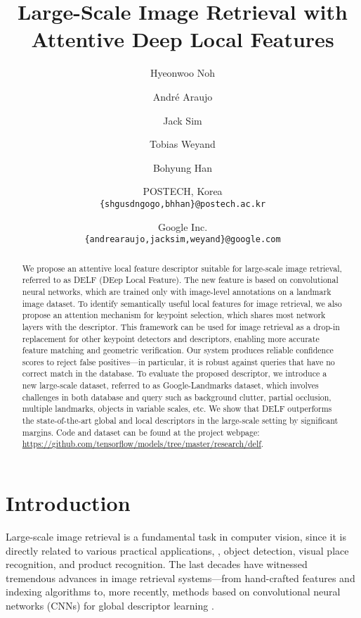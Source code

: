 \documentclass[10pt,twocolumn,letterpaper]{article}
\begin{document}
\title{Large-Scale Image Retrieval with Attentive Deep Local Features}

\author{Hyeonwoo Noh \and Andr\'{e} Araujo \and Jack Sim \and Tobias Weyand \and Bohyung Han \and 
POSTECH, Korea\\
{\tt\small \{shgusdngogo,bhhan\}@postech.ac.kr}
\and
Google Inc.\\
{\tt\small \{andrearaujo,jacksim,weyand\}@google.com}
}

\maketitle
\thispagestyle{empty}



\begin{abstract}

We propose an attentive local feature descriptor suitable for large-scale image retrieval, referred to as DELF (DEep Local Feature).
The new feature is based on convolutional neural networks, which are trained only with image-level annotations on a landmark image dataset.
To identify semantically useful local features for image retrieval, we also propose an attention mechanism for keypoint selection, which shares most network layers with the descriptor.
This framework can be used for image retrieval as a drop-in replacement for other keypoint detectors and descriptors, enabling more accurate feature matching and geometric verification.
Our system produces reliable confidence scores to reject false positives---in particular, it is robust against queries that have no correct match in the database.
To evaluate the proposed descriptor, we introduce a new large-scale dataset, referred to as Google-Landmarks dataset, which involves challenges in both database and query such as background clutter, partial occlusion, multiple landmarks, objects in variable scales, etc.
We show that DELF outperforms the state-of-the-art global and local descriptors in the large-scale setting by significant margins.
Code and dataset can be found at the project webpage: \url{https://github.com/tensorflow/models/tree/master/research/delf}.
\end{abstract} 




\section{Introduction} \label{sec:introduction}
Large-scale image retrieval is a fundamental task in computer vision, since it is directly related to various practical applications, \eg, object detection, visual place recognition, and product recognition.
The last decades have witnessed tremendous advances in image retrieval systems---from hand-crafted features and indexing algorithms \cite{Lowe2004,Sivic2003,Philbin07,Jegou2008} to, more recently, methods based on convolutional neural networks (CNNs) for global descriptor learning \cite{arandjelovic2015netvlad,radenovic2016cnn,gordo2016deep}.
\end{document}
